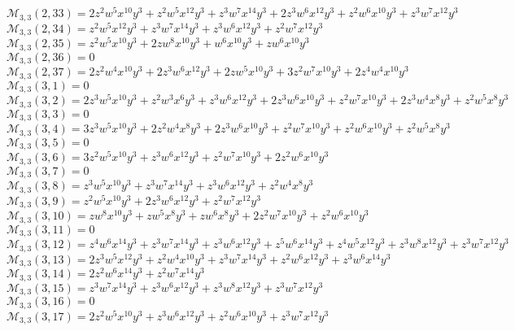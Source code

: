 $\mathcal{M}_{3,3}(2,33)=2z^2w^5x^{10}y^3+z^2w^5x^{12}y^3+z^3w^7x^{14}y^3+2z^3w^6x^{12}y^3+z^2w^6x^{10}y^3+z^3w^7x^{12}y^3$\\
$\mathcal{M}_{3,3}(2,34)=z^2w^5x^{12}y^3+z^3w^7x^{14}y^3+z^3w^6x^{12}y^3+z^2w^7x^{12}y^3$\\
$\mathcal{M}_{3,3}(2,35)=z^2w^5x^{10}y^3+2zw^8x^{10}y^3+w^6x^{10}y^3+zw^6x^{10}y^3$\\
$\mathcal{M}_{3,3}(2,36)=0$\\
$\mathcal{M}_{3,3}(2,37)=2z^2w^4x^{10}y^3+2z^3w^6x^{12}y^3+2zw^5x^{10}y^3+3z^2w^7x^{10}y^3+2z^4w^4x^{10}y^3$\\
$\mathcal{M}_{3,3}(3,1)=0$\\
$\mathcal{M}_{3,3}(3,2)=2z^3w^5x^{10}y^3+z^2w^3x^6y^3+z^3w^6x^{12}y^3+2z^3w^6x^{10}y^3+z^2w^7x^{10}y^3+2z^3w^4x^8y^3+z^2w^5x^8y^3$\\
$\mathcal{M}_{3,3}(3,3)=0$\\
$\mathcal{M}_{3,3}(3,4)=3z^3w^5x^{10}y^3+2z^2w^4x^8y^3+2z^3w^6x^{10}y^3+z^2w^7x^{10}y^3+z^2w^6x^{10}y^3+z^2w^5x^8y^3$\\
$\mathcal{M}_{3,3}(3,5)=0$\\
$\mathcal{M}_{3,3}(3,6)=3z^2w^5x^{10}y^3+z^3w^6x^{12}y^3+z^2w^7x^{10}y^3+2z^2w^6x^{10}y^3$\\
$\mathcal{M}_{3,3}(3,7)=0$\\
$\mathcal{M}_{3,3}(3,8)=z^3w^5x^{10}y^3+z^3w^7x^{14}y^3+z^3w^6x^{12}y^3+z^2w^4x^8y^3$\\
$\mathcal{M}_{3,3}(3,9)=z^2w^5x^{10}y^3+2z^3w^6x^{12}y^3+z^2w^7x^{12}y^3$\\
$\mathcal{M}_{3,3}(3,10)=zw^8x^{10}y^3+zw^5x^8y^3+zw^6x^8y^3+2z^2w^7x^{10}y^3+z^2w^6x^{10}y^3$\\
$\mathcal{M}_{3,3}(3,11)=0$\\
$\mathcal{M}_{3,3}(3,12)=z^4w^6x^{14}y^3+z^3w^7x^{14}y^3+z^3w^6x^{12}y^3+z^5w^6x^{14}y^3+z^4w^5x^{12}y^3+z^3w^8x^{12}y^3+z^3w^7x^{12}y^3$\\
$\mathcal{M}_{3,3}(3,13)=2z^3w^5x^{12}y^3+z^2w^4x^{10}y^3+z^3w^7x^{14}y^3+z^2w^6x^{12}y^3+z^3w^6x^{14}y^3$\\
$\mathcal{M}_{3,3}(3,14)=2z^2w^6x^{14}y^3+z^2w^7x^{14}y^3$\\
$\mathcal{M}_{3,3}(3,15)=z^3w^7x^{14}y^3+z^3w^6x^{12}y^3+z^3w^8x^{12}y^3+z^3w^7x^{12}y^3$\\
$\mathcal{M}_{3,3}(3,16)=0$\\
$\mathcal{M}_{3,3}(3,17)=2z^2w^5x^{10}y^3+z^3w^6x^{12}y^3+z^2w^6x^{10}y^3+z^3w^7x^{12}y^3$\\
